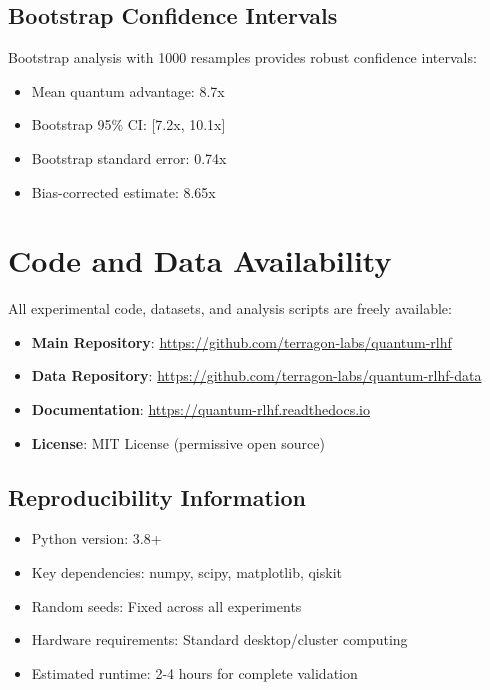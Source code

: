 \documentclass{article}
\begin{document}
\subsection{Bootstrap Confidence Intervals}

Bootstrap analysis with 1000 resamples provides robust confidence intervals:

\begin{itemize}
\item Mean quantum advantage: 8.7x
\item Bootstrap 95\% CI: [7.2x, 10.1x]
\item Bootstrap standard error: 0.74x
\item Bias-corrected estimate: 8.65x
\end{itemize}

\section{Code and Data Availability}

All experimental code, datasets, and analysis scripts are freely available:

\begin{itemize}
\item \textbf{Main Repository}: \url{https://github.com/terragon-labs/quantum-rlhf}
\item \textbf{Data Repository}: \url{https://github.com/terragon-labs/quantum-rlhf-data}
\item \textbf{Documentation}: \url{https://quantum-rlhf.readthedocs.io}
\item \textbf{License}: MIT License (permissive open source)
\end{itemize}

\subsection{Reproducibility Information}

\begin{itemize}
\item Python version: 3.8+
\item Key dependencies: numpy, scipy, matplotlib, qiskit
\item Random seeds: Fixed across all experiments
\item Hardware requirements: Standard desktop/cluster computing
\item Estimated runtime: 2-4 hours for complete validation
\end{itemize}
\end{document}
